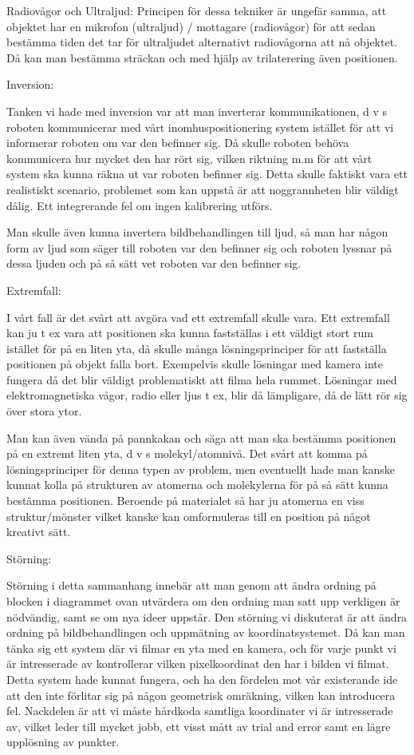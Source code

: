 \documentclass[11pt, a4paper]{report}
\begin{document}
Radiovågor och Ultraljud:
Principen för dessa tekniker är ungefär samma, att objektet har en mikrofon (ultraljud) / mottagare (radiovågor) för att sedan bestämma tiden det tar för ultraljudet alternativt radiovågorna att nå objektet. Då kan man bestämma sträckan och med hjälp av trilaterering även positionen.


Inversion:

Tanken vi hade med inversion var att man inverterar kommunikationen, d v s roboten kommunicerar med vårt inomhuspositionering system istället för att vi informerar roboten om var den befinner sig. Då skulle roboten behöva kommunicera hur mycket den har rört sig, vilken riktning m.m för att vårt system ska kunna räkna ut var roboten befinner sig. Detta skulle faktiskt vara ett realistiskt scenario, problemet som kan uppstå är att noggrannheten blir väldigt dålig. Ett integrerande fel om ingen kalibrering utförs.

Man skulle även kunna invertera bildbehandlingen till ljud, så man har någon form av ljud som säger till roboten var den befinner sig och roboten lyssnar på dessa ljuden och på så sätt vet roboten var den befinner sig. 

Extremfall:

I vårt fall är det svårt att avgöra vad ett extremfall skulle vara. Ett extremfall kan ju t ex vara att positionen ska kunna fastställas i ett väldigt stort rum istället för på en liten yta, då skulle många lösningsprinciper för att fastställa positionen på objekt falla bort. Exempelvis skulle lösningar med kamera inte fungera då det blir väldigt problematiskt att filma hela rummet. Lösningar med elektromagnetiska vågor, radio eller ljus t ex, blir då lämpligare, då de lätt rör sig över stora ytor.

Man kan även vända på pannkakan och säga att man ska bestämma positionen på en extremt liten yta, d v s molekyl/atomnivå. Det svårt att komma på lösningsprinciper för denna typen av problem, men eventuellt hade man kanske kunnat kolla på strukturen av atomerna och molekylerna för på så sätt kunna bestämma positionen. Beroende på materialet så har ju atomerna en viss struktur/mönster vilket kanske kan omformuleras till en position på något kreativt sätt.


Störning:

Störning i detta sammanhang innebär att man genom att ändra ordning på blocken i diagrammet ovan utvärdera om den ordning man satt upp verkligen är nödvändig, samt se om nya ideer uppstår. Den störning vi diskuterat är att ändra ordning på bildbehandlingen och uppmätning av koordinatsystemet. Då kan man tänka sig ett system där vi filmar en yta med en kamera, och för varje punkt vi är intresserade av kontrollerar vilken pixelkoordinat den har i bilden vi filmat. Detta system hade kunnat fungera, och ha den fördelen mot vår existerande ide att den inte förlitar sig på någon geometrisk omräkning, vilken kan introducera fel. Nackdelen är att vi måste hårdkoda samtliga koordinater vi är intresserade av, vilket leder till mycket jobb, ett visst mått av trial and error samt en lägre upplösning av punkter.
\end{document}
